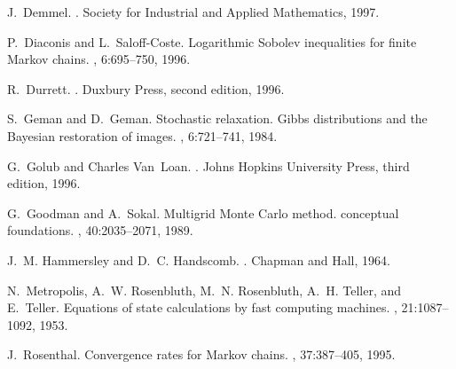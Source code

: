 \documentclass[12pt,letterpaper]{report}
\theoremstyle{plain}
\theoremstyle{definition}
\theoremstyle{remark}
\numberwithin{theorem}{chapter}
\numberwithin{claim}{chapter}
\numberwithin{equation}{chapter}
\numberwithin{conjecture}{chapter}
\newcommand\<{\ensuremath{\langle}}
\renewcommand\>{\ensuremath{\rangle}}
\begin{document}
\def\cprime{$'$} \def\cprime{$'$}
  \def\ocirc#1{\ifmmode\setbox0=\hbox{$#1$}\dimen0=\ht0 \advance\dimen0
  by1pt\rlap{\hbox to\wd0{\hss\raise\dimen0
  \hbox{\hskip.2em$\scriptscriptstyle\circ$}\hss}}#1\else {\accent"17 #1}\fi}
\begin{thebibliography}{1}

J.~Demmel.
.
\newblock Society for Industrial and Applied Mathematics, 1997.

P.~Diaconis and L.~Saloff-Coste.
\newblock Logarithmic {S}obolev inequalities for finite {M}arkov chains.
, 6:695--750, 1996.

R.~Durrett.
.
\newblock Duxbury Press, second edition, 1996.

S.~Geman and D.~Geman.
\newblock Stochastic relaxation. {G}ibbs distributions and the {B}ayesian
  restoration of images.
,
  6:721--741, 1984.

G.~Golub and Charles Van~Loan.
.
\newblock Johns Hopkins University Press, third edition, 1996.

G.~Goodman and A.~Sokal.
\newblock Multigrid {M}onte {C}arlo method. conceptual foundations.
, 40:2035--2071, 1989.

J.~M. Hammersley and D.~C. Handscomb.
.
\newblock Chapman and Hall, 1964.

N.~Metropolis, A.~W. Rosenbluth, M.~N. Rosenbluth, A.~H. Teller, and E.~Teller.
\newblock Equations of state calculations by fast computing machines.
, 21:1087--1092, 1953.

J.~Rosenthal.
\newblock Convergence rates for {M}arkov chains.
, 37:387--405, 1995.

\end{thebibliography}
\end{document}
